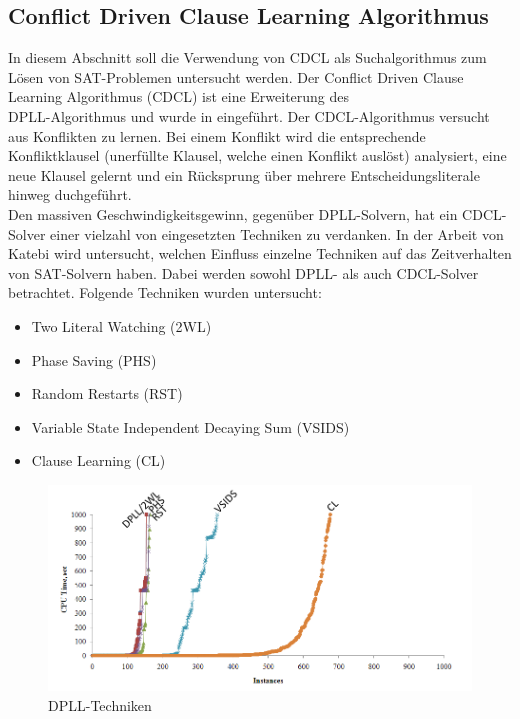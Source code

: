 \subsection{Conflict Driven Clause Learning Algorithmus}
\label{cdcl}
In diesem Abschnitt soll die Verwendung von CDCL als
Suchalgorithmus zum Lösen von  SAT-Problemen untersucht werden.
Der Conflict Driven Clause Learning Algorithmus (CDCL) ist eine
Erweiterung des \\DPLL-Algorithmus und wurde in \cite{paper:silva:1997} eingeführt.
Der CDCL-Algorithmus versucht aus Konflikten zu lernen. Bei einem Konflikt wird die
entsprechende Konfliktklausel (unerfüllte Klausel, welche einen Konflikt auslöst)
analysiert, eine neue Klausel gelernt und ein Rücksprung über
mehrere Entscheidungsliterale hinweg duchgeführt.\\
Den massiven Geschwindigkeitsgewinn, gegenüber DPLL-Solvern,  
hat ein CDCL-Solver einer vielzahl von eingesetzten Techniken 
zu verdanken.
In der Arbeit von Katebi \cite{katebi:2011} wird untersucht,
welchen Einfluss einzelne Techniken auf das Zeitverhalten
von SAT-Solvern haben. Dabei werden sowohl DPLL- als auch 
CDCL-Solver betrachtet. Folgende Techniken wurden untersucht:\\
\begin{itemize}
\item 
  Two Literal Watching (2WL) \cite{moskewicz:2001}
\item 
  Phase Saving (PHS) \cite{pipatsrisawar:2007}
\item 
  Random Restarts (RST) \cite{gomes:1998}
\item 
  Variable State Independent Decaying Sum (VSIDS) \cite{moskewicz:2001}
\item 
  Clause Learning (CL) \cite{paper:silva:1997}
\end{itemize}
\begin{figure}[h]
  \includegraphics[width=\textwidth]{abb/dpll-teq.png}
  \caption{DPLL-Techniken  \cite{katebi:2011}}
  \label{dpll-teq}
\end{figure}
